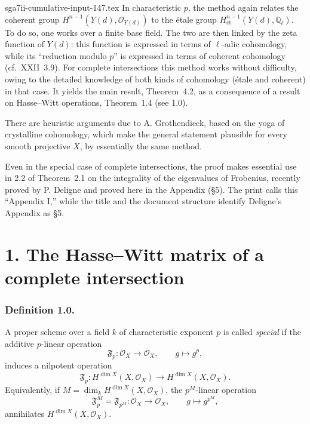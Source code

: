 \begin{filecontents*}{sga7ii-cumulative-input-147.tex}
In characteristic $p$, the method again relates the coherent group
$H^{n-1}(Y(d),\mathcal O_{Y(d)})$ to the étale group
$H^{n-1}_{\mathrm{et}}(Y(d),\mathbb Q_\ell)$.  To do so, one works over a
finite base field.  The two are then linked by the zeta function of $Y(d)$:
this function is expressed in terms of $\ell$-adic cohomology, while its
``reduction modulo $p$'' is expressed in terms of coherent cohomology
(cf.~XXII~3.9).  For complete intersections this method works without
difficulty, owing to the detailed knowledge of both kinds of cohomology
(étale and coherent) in that case.  It yields the main result, Theorem~4.2,
as a consequence of a result on Hasse--Witt operations, Theorem~1.4 (see
1.0).

There are heuristic arguments due to A. Grothendieck, based on the yoga of
crystalline cohomology, which make the general statement plausible for every
smooth projective $X$, by essentially the same method.

Even in the special case of complete intersections, the proof makes
essential use in 2.2 of Theorem~2.1 on the integrality of the eigenvalues of
Frobenius, recently proved by P. Deligne and proved here in the Appendix
(\S 5).  The print calls this ``Appendix I,'' while the title and the document
structure identify Deligne's Appendix as \S 5.

\section*{1. The Hasse--Witt matrix of a complete intersection}

\subsubsection*{Definition 1.0.}
A proper scheme over a field $k$ of characteristic exponent $p$ is called
\emph{special} if the additive $p$-linear operation
\begin{equation}\tag{1.0.1}
\mathfrak F_p:\mathcal O_X\longrightarrow\mathcal O_X,
\qquad g\longmapsto g^p,
\end{equation}
induces a nilpotent operation
\begin{equation}\tag{1.0.2}
\mathfrak F_p:H^{\dim X}(X,\mathcal O_X)
\longrightarrow H^{\dim X}(X,\mathcal O_X).
\end{equation}
Equivalently, if
$M=\dim_k H^{\dim X}(X,\mathcal O_X)$, the $p^M$-linear operation
\begin{equation}\tag{1.0.3}
\mathfrak F_p^M=\mathfrak F_{p^M}:\mathcal O_X\longrightarrow\mathcal O_X,
\qquad g\longmapsto g^{p^M},
\end{equation}
annihilates $H^{\dim X}(X,\mathcal O_X)$.


\end{filecontents*}
